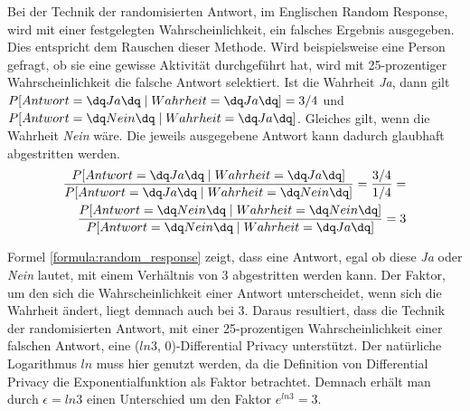 Bei der Technik der randomisierten Antwort, im Englischen Random Response, wird mit einer festgelegten Wahrscheinlichkeit, ein falsches Ergebnis ausgegeben. 
Dies entspricht dem Rauschen dieser Methode.
Wird beispielsweise eine Person gefragt, ob sie eine gewisse Aktivität durchgeführt hat, wird mit 25-prozentiger Wahrscheinlichkeit die falsche Antwort selektiert.
Ist die Wahrheit \textit{\dq Ja\dq}, dann gilt $P[Antwort = \dq Ja\dq \mid Wahrheit = \dq Ja\dq] = 3/4$ und $P[Antwort = \dq Nein\dq \mid Wahrheit = \dq Ja\dq]$.
Gleiches gilt, wenn die Wahrheit \textit{\dq Nein\dq} wäre.
Die jeweils ausgegebene Antwort kann dadurch glaubhaft abgestritten werden.
\begin{equation} \label{formula:random_response}
\begin{split}
\frac{P[Antwort = \dq Ja\dq \mid Wahrheit = \dq Ja\dq]}{P[Antwort = \dq Ja\dq \mid Wahrheit = \dq Nein\dq]} = \frac{3/4}{1/4} = \\
\frac{P[Antwort = \dq Nein\dq \mid Wahrheit = \dq Nein\dq]}{P[Antwort = \dq Nein\dq \mid Wahrheit = \dq Ja\dq]} =  3
\end{split}
\end{equation}

Formel \ref{formula:random_response} zeigt, dass eine Antwort, egal ob diese \textit{\dq Ja\dq} oder \textit{\dq Nein\dq} lautet, mit einem Verhältnis von 3 abgestritten werden kann.
Der Faktor, um den sich die Wahrscheinlichkeit einer Antwort unterscheidet, wenn sich die Wahrheit ändert, liegt demnach auch bei 3.
Daraus resultiert, dass die Technik der randomisierten Antwort, mit einer 25-prozentigen Wahrscheinlichkeit einer falschen Antwort, eine ($ln 3$, 0)-Differential Privacy unterstützt.
Der natürliche Logarithmus $ln$ muss hier genutzt werden, da die Definition von Differential Privacy die Exponentialfunktion als Faktor betrachtet. 
Demnach erhält man durch $\epsilon = ln 3$ einen Unterschied um den Faktor $e^{ln 3} = 3$.

